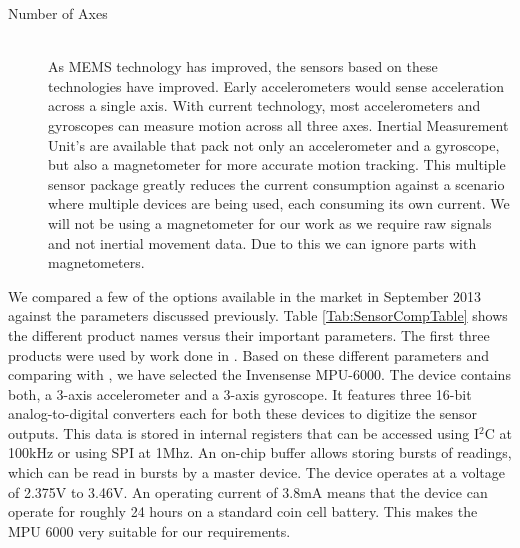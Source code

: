 \begin{description}
\item[Number of Axes] \hfill \\
As MEMS technology has improved, the sensors based on these technologies have improved.
Early accelerometers would sense acceleration across a single axis.
With current technology, most accelerometers and gyroscopes can measure motion across all three axes.
Inertial Measurement Unit's are available that pack not only an accelerometer and a gyroscope,
but also a magnetometer for more accurate motion tracking.
This multiple sensor package greatly reduces the current consumption against a scenario where multiple devices are being used, each consuming its own current.
We will not be using a magnetometer for our work as we require raw signals and not inertial movement data.
Due to this we can ignore parts with magnetometers.
\end{description}
We compared a few of the options available in the market in September 2013 against the parameters discussed previously.
Table \ref{Tab:SensorCompTable} shows the different product names versus their important parameters. The first three products were used by work done in \cite{drennan2010assessment}.
Based on these different parameters and comparing with \cite{drennan2010assessment}, we have selected the Invensense MPU-6000. The device contains both, a 3-axis accelerometer and a 3-axis gyroscope. It features three 16-bit analog-to-digital converters each for both these devices to digitize the sensor outputs. This data is stored in internal registers that can be accessed using I$^{2}$C at 100kHz or using SPI at 1Mhz. An on-chip buffer allows storing bursts of readings, which can be read in bursts by a master device. The device operates at a voltage of 2.375V to 3.46V. An operating current of 3.8mA means that the device can operate for roughly 24 hours on a standard coin cell battery. This makes the MPU 6000 very suitable for our requirements.

